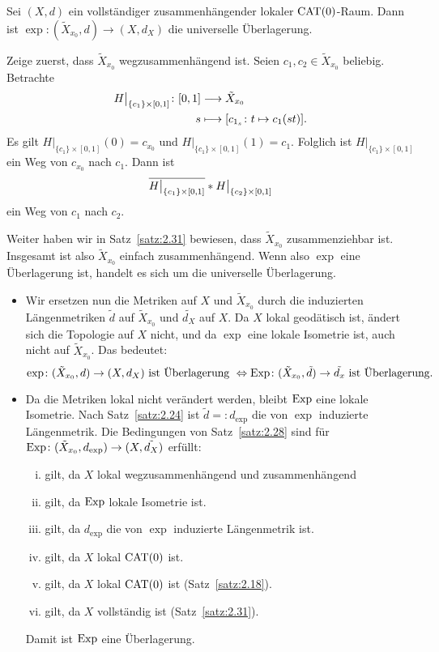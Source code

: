 \begin{satz}
\label{satz:2.33}
	Sei $(X,d)$ ein vollständiger zusammenhängender lokaler $\operatorname{CAT(0)}$-Raum. 
	Dann ist $\exp\colon (\tilde{X}_{x_0},d) \rightarrow (X,d_X)$ die universelle Überlagerung.
\end{satz}

\begin{beweis}
	Zeige zuerst, dass $\tilde{X}_{x_0}$ wegzusammenhängend ist.
	Seien $c_1,c_2 \in \tilde{X}_{x_0}$ beliebig.
	Betrachte
	\begin{align*}
		H \big|_{\{c_1\} \times [0,1]} \colon [0,1] &\longrightarrow \tilde{X}_{x_0} \\
		s &\longmapsto \benbrace*{c_{1_s} \colon t \mapsto c_1(st)}.
	\end{align*}
	Es gilt $H \big|_{\{c_1\} \times [0,1]}(0) = c_{x_0}$ und $H \big|_{\{c_1\} \times [0,1]}(1) = c_1$.
	Folglich ist $H\big|_{\{c_1\} \times [0,1]}$ ein Weg von $c_{x_0}$ nach $c_1$.
	Dann ist
	\[
		\overline{H \big|_{\{c_1\} \times [0,1]}} * H \big|_{\{c_2\} \times [0,1]}
	\] 
	ein Weg von $c_1$ nach $c_2$.
	
	Weiter haben wir in Satz~\ref{satz:2.31} bewiesen, dass $\tilde{X}_{x_0}$ zusammenziehbar ist.
	Insgesamt ist also $\tilde{X}_{x_0}$ einfach zusammenhängend.
	Wenn also $\exp$ eine Überlagerung ist, handelt es sich um die universelle Überlagerung.
	\begin{itemize}
		\item Wir ersetzen nun die Metriken auf $X$ und $\tilde{X}_{x_0}$ durch die induzierten Längenmetriken $\tilde{d}$ auf $\tilde{X}_{x_0}$ und $\tilde{d_X}$ auf $X$.
		Da $X$ lokal geodätisch ist, ändert sich die Topologie auf $X$ nicht, und da $\exp$ eine lokale Isometrie ist, auch nicht auf $\tilde{X}_{x_0}$.
		Das bedeutet:
		\[
			\exp\colon (\tilde{X}_{x_0},d) \rightarrow (X,d_X) \text{ ist Überlagerung } \Leftrightarrow \operatorname{Exp}\colon (\tilde{X}_{x_0},\tilde{d}) \rightarrow \tilde{d_x} \text{ ist Überlagerung.}
		\]
		\item Da die Metriken lokal nicht verändert werden, bleibt $\operatorname{Exp}$ eine lokale Isometrie.
		Nach Satz~\ref{satz:2.24} ist $\tilde{d} =: d_{\exp}$ die von $\exp$ induzierte Längenmetrik.
		Die Bedingungen von Satz~\ref{satz:2.28} sind für \linebreak $\operatorname{Exp}\colon (\tilde{X}_{x_0},d_{\exp}) \rightarrow (X,\tilde{d_X})$ erfüllt:
		\begin{enumerate}[(i)]
			\item gilt, da $X$ lokal wegzusammenhängend und zusammenhängend
			\item gilt, da $\operatorname{Exp}$ lokale Isometrie ist.
			\item gilt, da $d_{\exp}$ die von $\exp$ induzierte Längenmetrik ist.
			\item gilt, da $X$ lokal $\operatorname{CAT(0)}$ ist.
			\item gilt, da $X$ lokal $\operatorname{CAT(0)}$ ist (Satz~\ref{satz:2.18}).
			\item gilt, da $X$ vollständig ist (Satz~\ref{satz:2.31}).
		\end{enumerate}
		Damit ist $\operatorname{Exp}$ eine Überlagerung. 
	\end{itemize}
\end{beweis}

